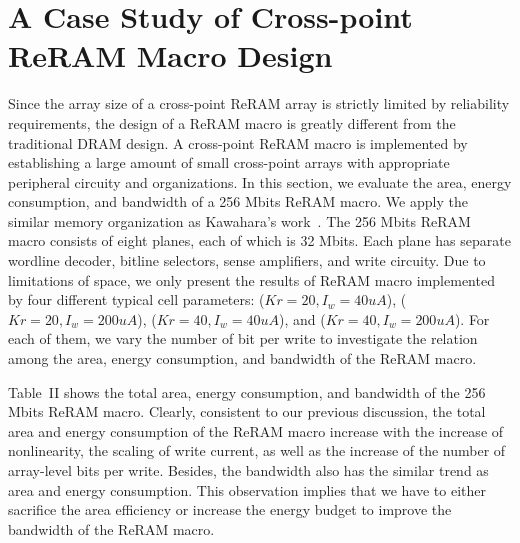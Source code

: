 \vspace{-5pt}
\section{A Case Study of Cross-point ReRAM Macro Design}\label{sec:macro}
Since the array size of a cross-point ReRAM array is strictly limited by
reliability requirements, the design of a ReRAM macro is greatly different
from the traditional DRAM design. A cross-point ReRAM macro is implemented
by establishing a large amount of small cross-point arrays with
appropriate peripheral circuity and organizations. In this section, we
evaluate the area, energy consumption, and bandwidth of a 256 Mbits ReRAM
macro. We apply the similar memory organization as Kawahara's
work~\cite{crossbar_Panasonic}. The 256 Mbits ReRAM macro consists of
eight planes, each of which is 32 Mbits. Each plane has separate wordline
decoder, bitline selectors, sense amplifiers, and write circuity. Due to
limitations of space, we only present the results of ReRAM macro
implemented by four different typical cell parameters: ($Kr=20,
I_w=40uA$), ($Kr=20, I_w=200uA$), ($Kr=40, I_w=40uA$), and ($Kr=40,
I_w=200uA$). For each of them, we vary the number of bit per write to
investigate the relation among the area, energy consumption, and bandwidth
of the ReRAM macro.


Table~II shows the total area, energy consumption, and bandwidth of the
256 Mbits ReRAM macro. Clearly, consistent to our previous discussion, the
total area and energy consumption of the ReRAM macro increase with the
increase of nonlinearity, the scaling of write current, as well as the
increase of the number of array-level bits per write. Besides, the
bandwidth also has the similar trend as area and energy consumption. This
observation implies that we have to either sacrifice the area efficiency
or increase the energy budget to improve the bandwidth of the ReRAM macro.

